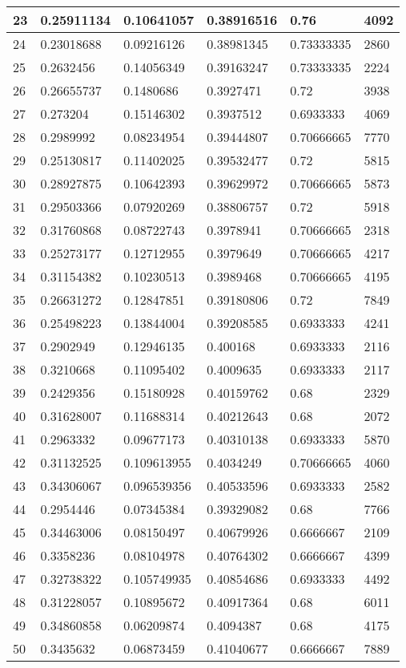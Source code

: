 \begin{longtable}{|l|l|l|l|l|l|}
23 & 0.25911134 & 0.10641057 & 0.38916516 & 0.76 & 4092 \\ \hline 
24 & 0.23018688 & 0.09216126 & 0.38981345 & 0.73333335 & 2860 \\ \hline 
25 & 0.2632456 & 0.14056349 & 0.39163247 & 0.73333335 & 2224 \\ \hline 
26 & 0.26655737 & 0.1480686 & 0.3927471 & 0.72 & 3938 \\ \hline 
27 & 0.273204 & 0.15146302 & 0.3937512 & 0.6933333 & 4069 \\ \hline 
28 & 0.2989992 & 0.08234954 & 0.39444807 & 0.70666665 & 7770 \\ \hline 
29 & 0.25130817 & 0.11402025 & 0.39532477 & 0.72 & 5815 \\ \hline 
30 & 0.28927875 & 0.10642393 & 0.39629972 & 0.70666665 & 5873 \\ \hline 
31 & 0.29503366 & 0.07920269 & 0.38806757 & 0.72 & 5918 \\ \hline 
32 & 0.31760868 & 0.08722743 & 0.3978941 & 0.70666665 & 2318 \\ \hline 
33 & 0.25273177 & 0.12712955 & 0.3979649 & 0.70666665 & 4217 \\ \hline 
34 & 0.31154382 & 0.10230513 & 0.3989468 & 0.70666665 & 4195 \\ \hline 
35 & 0.26631272 & 0.12847851 & 0.39180806 & 0.72 & 7849 \\ \hline 
36 & 0.25498223 & 0.13844004 & 0.39208585 & 0.6933333 & 4241 \\ \hline 
37 & 0.2902949 & 0.12946135 & 0.400168 & 0.6933333 & 2116 \\ \hline 
38 & 0.3210668 & 0.11095402 & 0.4009635 & 0.6933333 & 2117 \\ \hline 
39 & 0.2429356 & 0.15180928 & 0.40159762 & 0.68 & 2329 \\ \hline 
40 & 0.31628007 & 0.11688314 & 0.40212643 & 0.68 & 2072 \\ \hline 
41 & 0.2963332 & 0.09677173 & 0.40310138 & 0.6933333 & 5870 \\ \hline 
42 & 0.31132525 & 0.109613955 & 0.4034249 & 0.70666665 & 4060 \\ \hline 
43 & 0.34306067 & 0.096539356 & 0.40533596 & 0.6933333 & 2582 \\ \hline 
44 & 0.2954446 & 0.07345384 & 0.39329082 & 0.68 & 7766 \\ \hline 
45 & 0.34463006 & 0.08150497 & 0.40679926 & 0.6666667 & 2109 \\ \hline 
46 & 0.3358236 & 0.08104978 & 0.40764302 & 0.6666667 & 4399 \\ \hline 
47 & 0.32738322 & 0.105749935 & 0.40854686 & 0.6933333 & 4492 \\ \hline 
48 & 0.31228057 & 0.10895672 & 0.40917364 & 0.68 & 6011 \\ \hline 
49 & 0.34860858 & 0.06209874 & 0.4094387 & 0.68 & 4175 \\ \hline 
50 & 0.3435632 & 0.06873459 & 0.41040677 & 0.6666667 & 7889 \\ \hline 
\end{longtable}
